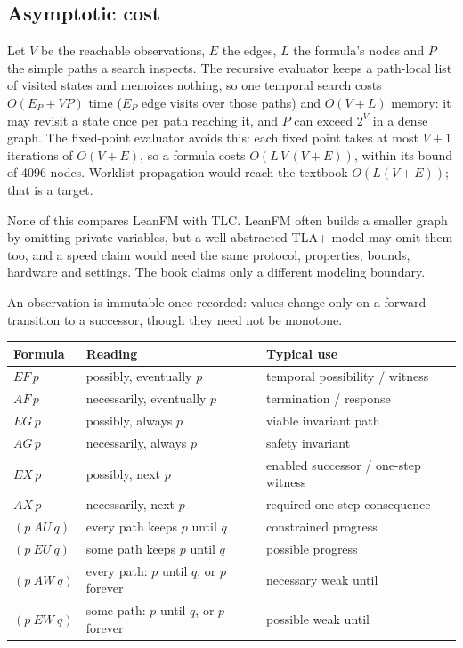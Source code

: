 \subsection{Asymptotic cost}

Let $V$ be the reachable observations, $E$ the edges, $L$ the formula's nodes and
$P$ the simple paths a search inspects. The recursive evaluator keeps a path-local
list of visited states and memoizes nothing, so one temporal search costs
$O(E_P+VP)$ time ($E_P$ edge visits over those paths) and $O(V+L)$ memory: it may
revisit a state once per path reaching it, and $P$ can exceed $2^V$ in a dense
graph. The fixed-point evaluator avoids this: each fixed point takes at most $V+1$
iterations of $O(V+E)$, so a formula costs $O(L\,V\,(V+E))$, within its bound of
4096 nodes. Worklist propagation would reach the textbook $O(L(V+E))$; that is a
target.

None of this compares LeanFM with TLC. LeanFM often builds a smaller graph by
omitting private variables, but a well-abstracted TLA+ model may omit them too, and
a speed claim would need the same protocol, properties, bounds, hardware and
settings. The book claims only a different modeling boundary.

An observation is immutable once recorded: values change only on a forward
transition to a successor, though they need not be monotone.

\begin{center}
\begin{tabular}{@{}lll@{}}
\toprule
Formula & Reading & Typical use \\
\midrule
$EF\,p$ & possibly, eventually $p$ & temporal possibility / witness \\
$AF\,p$ & necessarily, eventually $p$ & termination / response \\
$EG\,p$ & possibly, always $p$ & viable invariant path \\
$AG\,p$ & necessarily, always $p$ & safety invariant \\
$EX\,p$ & possibly, next $p$ & enabled successor / one-step witness \\
$AX\,p$ & necessarily, next $p$ & required one-step consequence \\
$(p\ AU\ q)$ & every path keeps $p$ until $q$ & constrained progress \\
$(p\ EU\ q)$ & some path keeps $p$ until $q$ & possible progress \\
$(p\ AW\ q)$ & every path: $p$ until $q$, or $p$ forever & necessary weak until \\
$(p\ EW\ q)$ & some path: $p$ until $q$, or $p$ forever & possible weak until \\
\bottomrule
\end{tabular}
\end{center}

